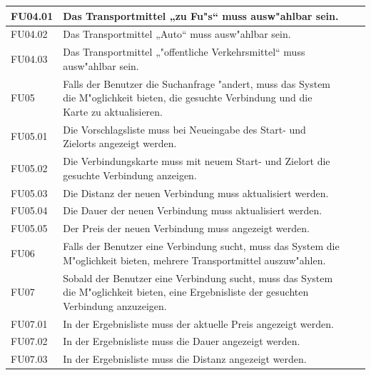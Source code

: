 \documentclass[a4paper, 11pt]{scrreprt}
\begin{document}
\begin{table}[H]
\begin{tabular}{|p{2.5cm} p{12cm}| ll}
\hline
FU04.01	&Das Transportmittel „zu Fu"s“ muss ausw"ahlbar sein.\\

\hline
FU04.02&	Das Transportmittel  „Auto“ muss ausw"ahlbar sein.\\

\hline
FU04.03	&Das Transportmittel „"offentliche Verkehrsmittel“ muss ausw"ahlbar sein.\\

\hline
FU05	&Falls der Benutzer die Suchanfrage "andert, muss das System die M"oglichkeit bieten, die gesuchte Verbindung und die Karte zu aktualisieren.\\

\hline
FU05.01	&Die Vorschlagsliste muss bei Neueingabe des Start- und Zielorts angezeigt werden.\\

\hline
FU05.02	&Die Verbindungskarte muss mit neuem Start- und Zielort die gesuchte Verbindung anzeigen.\\

\hline
FU05.03	&Die Distanz der neuen Verbindung muss aktualisiert werden.\\

\hline
FU05.04&	Die Dauer der neuen Verbindung muss aktualisiert werden.\\

\hline
FU05.05	&Der Preis der neuen Verbindung muss angezeigt werden.\\

\hline
FU06	&Falls der Benutzer eine Verbindung sucht, muss das System die M"oglichkeit bieten, mehrere Transportmittel auszuw"ahlen.\\

\hline
FU07	&Sobald der Benutzer eine Verbindung sucht, muss das System die M"oglichkeit bieten, eine Ergebnisliste der gesuchten Verbindung anzuzeigen.\\

\hline
FU07.01&	In der Ergebnisliste muss der aktuelle Preis angezeigt werden.\\

\hline
FU07.02 &	In der Ergebnisliste muss die Dauer angezeigt werden.\\

\hline
FU07.03&	In der Ergebnisliste muss die Distanz angezeigt werden.\\

\hline


\end{tabular}

\end{table}
\end{document}
